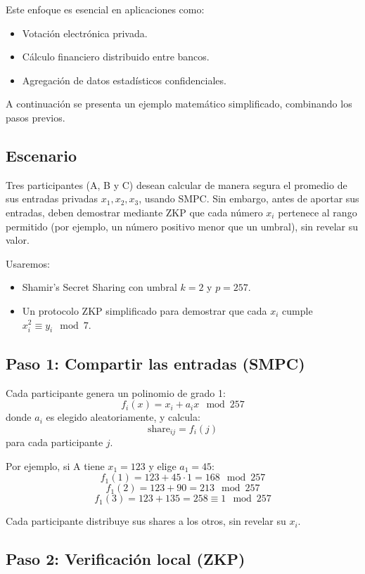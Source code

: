 \documentclass{article}
\begin{document}
Este enfoque es esencial en aplicaciones como:
\begin{itemize}
    \item Votación electrónica privada.
    \item Cálculo financiero distribuido entre bancos.
    \item Agregación de datos estadísticos confidenciales.
\end{itemize}

A continuación se presenta un ejemplo matemático simplificado, combinando los pasos previos.

\subsection{Escenario}

Tres participantes (A, B y C) desean calcular de manera segura el promedio de sus entradas privadas \( x_1, x_2, x_3 \), usando SMPC. Sin embargo, antes de aportar sus entradas, deben demostrar mediante ZKP que cada número \( x_i \) pertenece al rango permitido (por ejemplo, un número positivo menor que un umbral), sin revelar su valor.

Usaremos:
\begin{itemize}
    \item Shamir’s Secret Sharing con umbral \( k = 2 \) y \( p = 257 \).
    \item Un protocolo ZKP simplificado para demostrar que cada \( x_i \) cumple \( x_i^2 \equiv y_i \mod 7 \).
\end{itemize}

\subsection{Paso 1: Compartir las entradas (SMPC)}

Cada participante genera un polinomio de grado 1:
\[
f_i(x) = x_i + a_i x \mod 257
\]
donde \( a_i \) es elegido aleatoriamente, y calcula:
\[
\text{share}_{ij} = f_i(j)
\]
para cada participante \( j \).

Por ejemplo, si A tiene \( x_1 = 123 \) y elige \( a_1 = 45 \):
\[
f_1(1) = 123 + 45 \cdot 1 = 168 \mod 257
\]
\[
f_1(2) = 123 + 90 = 213 \mod 257
\]
\[
f_1(3) = 123 + 135 = 258 \equiv 1 \mod 257
\]

Cada participante distribuye sus shares a los otros, sin revelar su \( x_i \).

\subsection{Paso 2: Verificación local (ZKP)}
\end{document}
